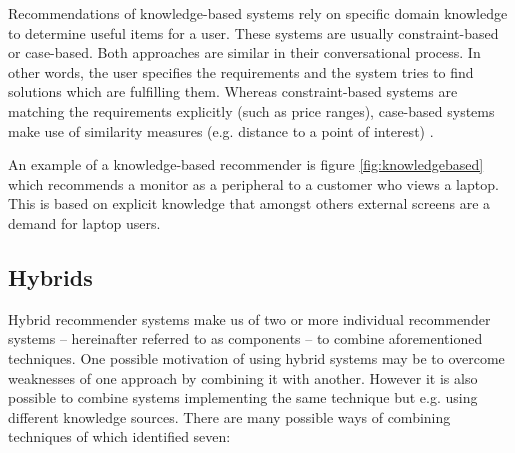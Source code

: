 Recommendations of knowledge-based systems rely on specific domain knowledge to determine useful items for a user. These systems are usually constraint-based or case-based. Both approaches are similar in their conversational process. In other words, the user specifies the requirements and the system tries to find solutions which are fulfilling them. Whereas constraint-based systems are matching the requirements explicitly (such as price ranges), case-based systems make use of similarity measures (e.g. distance to a point of interest) \cite{ricci11}.

An example of a knowledge-based recommender is figure \ref{fig:knowledgebased} which recommends a monitor as a peripheral to a customer who views a laptop. This is based on explicit knowledge that amongst others external screens are a demand for laptop users.

\subsection{Hybrids}
\label{bg-tech-hybrid}

Hybrid recommender systems make us of two or more individual recommender systems -- hereinafter referred to as components -- to combine aforementioned techniques. One possible motivation of using hybrid systems may be to overcome weaknesses of one approach by combining it with another. However it is also possible to combine systems implementing the same technique but e.g. using different knowledge sources. There are many possible ways of combining techniques of which \citet{burke07} identified seven:

